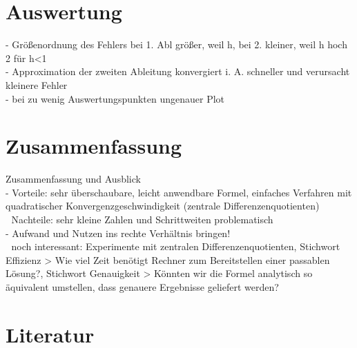 \documentclass{scrartcl}
\begin{document}
\pagebreak \section{Auswertung}
\label{sec:auswertung}
- Größenordnung des Fehlers bei 1. Abl größer, weil h, bei 2. kleiner, weil h hoch 2 für h<1 \\
- Approximation der zweiten Ableitung konvergiert i. A. schneller und verursacht kleinere Fehler \\
- bei zu wenig Auswertungspunkten ungenauer Plot \\

\pagebreak \section{Zusammenfassung}
\label{sec:zusammenfassung}
Zusammenfassung und Ausblick \\
- Vorteile: sehr überschaubare, leicht anwendbare Formel, einfaches Verfahren mit
quadratischer Konvergenzgeschwindigkeit (zentrale Differenzenquotienten) \\
 Nachteile: sehr kleine Zahlen und Schrittweiten problematisch \\
- Aufwand und Nutzen ins rechte Verhältnis bringen! \\
 noch interessant: Experimente mit zentralen Differenzenquotienten, Stichwort
Effizienz > Wie viel Zeit benötigt Rechner zum Bereitstellen einer passablen Lösung?,
Stichwort Genauigkeit > Könnten wir die Formel analytisch so äquivalent umstellen,
dass genauere Ergebnisse geliefert werden? \\

\pagebreak \section{Literatur}
\label{sec:literatur}
\end{document}
